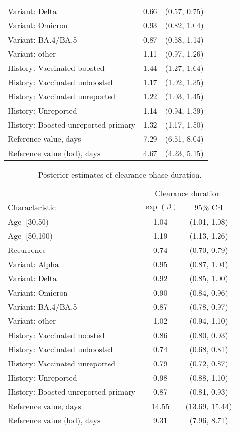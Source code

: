\begin{appendix}
\begin{table}[p]
\begin{tabular}{lcc}
         Variant: Delta & 0.66 & (0.57, 0.75)\\
         Variant: Omicron & 0.93 & (0.82, 1.04)\\
         Variant: BA.4/BA.5 & 0.87 & (0.68, 1.14)\\
         Variant: other & 1.11 & (0.97, 1.26)\\
         History: Vaccinated boosted & 1.44 & (1.27, 1.64)\\
         History: Vaccinated unboosted & 1.17 & (1.02, 1.35)\\
         History: Vaccinated unreported & 1.22 & (1.03, 1.45)\\
         History: Unreported & 1.14 & (0.94, 1.39)\\
         History: Boosted unreported primary & 1.32 & (1.17, 1.50)\\
         \midrule
         Reference value, days & 7.29 & (6.61, 8.04)\\
         Reference value (lod), days & 4.67 & (4.23, 5.15)\\
         \bottomrule
         \end{tabular}
   \end{table}

 \begin{table}[p]
    \centering
    \caption{Posterior estimates of clearance phase duration.}
    \begin{tabular}{lcc}
     \toprule
     & \multicolumn{2}{c}{Clearance duration} \\
     Characteristic & $\exp(\beta)$ & 95\% CrI\\
     \midrule
     Age: [30,50) & 1.04 & (1.01, 1.08)\\
     Age: [50,100) & 1.19 & (1.13, 1.26)\\
     Recurrence & 0.74 & (0.70, 0.79)\\
     Variant: Alpha & 0.95 & (0.87, 1.04)\\
     Variant: Delta & 0.92 & (0.85, 1.00)\\
     Variant: Omicron & 0.90 & (0.84, 0.96)\\
     Variant: BA.4/BA.5 & 0.87 & (0.78, 0.97)\\
     Variant: other & 1.02 & (0.94, 1.10)\\
     History: Vaccinated boosted & 0.86 & (0.80, 0.93)\\
     History: Vaccinated unboosted & 0.74 & (0.68, 0.81)\\
     History: Vaccinated unreported & 0.79 & (0.72, 0.87)\\
     History: Unreported & 0.98 & (0.88, 1.10)\\
     History: Boosted unreported primary & 0.87 & (0.81, 0.93)\\
     \midrule
     Reference value, days & 14.55 & (13.69, 15.44)\\
     Reference value (lod), days & 9.31 & (7.96, 8.71)\\
     \bottomrule
     \end{tabular}
\end{table}


\end{appendix}
